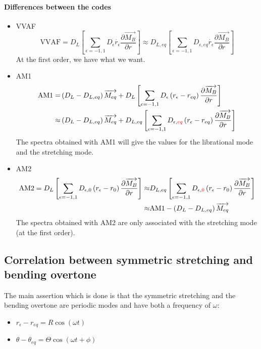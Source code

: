 \documentclass[12pt,a4paper]{article}
\newcommand{\MB}{\overrightarrow{M_B}}
\newcommand{\ME}{\overrightarrow{M_{eq}}}
\newcommand{\DE}{D_{L,eq}}
\newcommand{\dmdr}{\frac{\partial \MB}{\partial r}}
\begin{document}
\paragraph{Differences between the codes}
\begin{itemize}
\item VVAF
\begin{equation*}
  \text{VVAF}=D_L\left[ 
    \sum_{\epsilon=-1,1} D_{\epsilon} \dot{r_\epsilon} \dmdr
  \right]  
  \approx \DE \left[ \sum_{\epsilon=-1,1} D_{\epsilon,eq} \dot{r_\epsilon} \dmdr \right]
\end{equation*}
At the first order, we have what we want.
\item AM1
\begin{align*}
  \text{AM1} =& \left(D_L -\DE\right)\ME +
  D_L \left[ 
    \sum_{\epsilon=-1,1} D_\epsilon\left( r_\epsilon-r_{eq} \right) \dmdr
  \right]\\
  \approx& \left(D_L -\DE\right) \ME +\DE \left[
    \sum_{\epsilon=-1,1} D_{\epsilon,\color{red}eq}\left( r_\epsilon-r_{eq} \right) \dmdr
  \right]
\end{align*}
The spectra obtained with AM1 will give the values for the librational mode and the stretching mode.
\item AM2
\begin{align*}
  \text{AM2} = D_L\left[ \sum_{\epsilon=-1,1} D_{\epsilon,0} \left( r_\epsilon-r_0 \right) \dmdr \right] \approx &
  \DE\left[ \sum_{\epsilon=-1,1} D_{\epsilon,\color{red}0} \left( r_\epsilon-r_0 \right) \dmdr \right]\\
  \approx& \text{AM1} - \left(D_L -\DE\right) \ME
\end{align*}
The spectra obtained with AM2 are only associated with the stretching mode (at the first order).
\end{itemize}

\subsection{Correlation between symmetric stretching and bending overtone}
The main assertion which is done is that the symmetric stretching and the bending overtone are periodic modes and have both a frequency of $\omega$:
\begin{itemize}
\item $r_\epsilon-r_{eq} = R \cos(\omega t)$
\item $\theta - \theta_{eq} = \Theta \cos(\omega t + \phi) $
\end{itemize}
\end{document}
